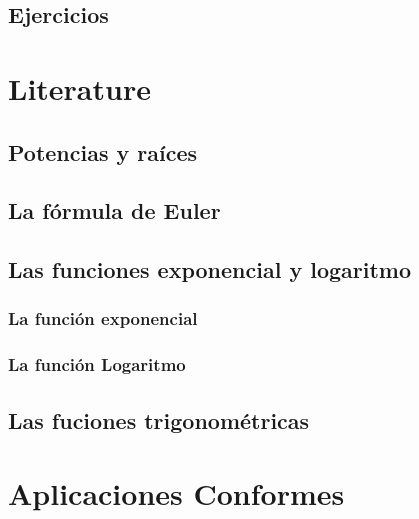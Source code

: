 \documentclass[]{book}
\begin{document}
\hypertarget{ejercicios-1}{%
\section{Ejercicios}\label{ejercicios-1}}

\hypertarget{literature}{%
\chapter{Literature}\label{literature}}

\hypertarget{potencias-y-rauxedces}{%
\section{Potencias y raíces}\label{potencias-y-rauxedces}}

\hypertarget{la-fuxf3rmula-de-euler}{%
\section{La fórmula de Euler}\label{la-fuxf3rmula-de-euler}}

\hypertarget{las-funciones-exponencial-y-logaritmo}{%
\section{Las funciones exponencial y logaritmo}\label{las-funciones-exponencial-y-logaritmo}}

\hypertarget{la-funciuxf3n-exponencial}{%
\subsection{La función exponencial}\label{la-funciuxf3n-exponencial}}

\hypertarget{la-funciuxf3n-logaritmo}{%
\subsection{La función Logaritmo}\label{la-funciuxf3n-logaritmo}}

\hypertarget{las-fuciones-trigonomuxe9tricas}{%
\section{Las fuciones trigonométricas}\label{las-fuciones-trigonomuxe9tricas}}

\hypertarget{aplicaciones-conformes}{%
\chapter{Aplicaciones Conformes}\label{aplicaciones-conformes}}
\end{document}
